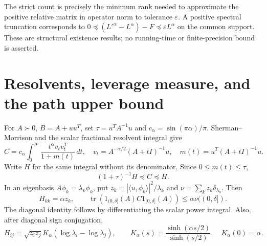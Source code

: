 \documentclass[11pt]{article}
\newcommand{\tr}{\operatorname{tr}}
\begin{document}
The strict count is precisely the minimum rank needed to approximate
the positive relative matrix in operator norm to tolerance
$\varepsilon$. A positive spectral truncation corresponds to
$0\preceq (L'^\alpha-L^\alpha)-F\preceq\varepsilon L^\alpha$
on the common support. These are structural existence results;
no running-time or finite-precision bound is asserted.

\section{Resolvents, leverage measure, and the path upper bound}
For $A\succ0$, $B=A+uu^T$, set $\tau=u^TA^{-1}u$ and
$c_\alpha=\sin(\pi\alpha)/\pi$. Sherman--Morrison and the scalar
fractional resolvent integral give
\begin{equation}\label{eq:res}
 C=c_\alpha\int_0^\infty
 \frac{t^\alpha v_tv_t^T}{1+m(t)}\,dt,\quad
 v_t=A^{-\alpha/2}(A+tI)^{-1}u,\quad
 m(t)=u^T(A+tI)^{-1}u.
\end{equation}
Write $H$ for the same integral without its denominator. Since
$0\le m(t)\le\tau$,
\begin{equation}\label{eq:sandwich}
 (1+\tau)^{-1}H\preceq C\preceq H.
\end{equation}
In an eigenbasis $A\phi_k=\lambda_k\phi_k$, put
$z_k=|\langle u,\phi_k\rangle|^2/\lambda_k$ and
$\nu=\sum_kz_k\delta_{\lambda_k}$. Then
\begin{equation}\label{eq:diag}
 H_{kk}=\alpha z_k,\qquad
 \tr(1_{(0,\delta]}(A)C1_{(0,\delta]}(A))
                                      \le\alpha\nu((0,\delta]).
\end{equation}
The diagonal identity follows by differentiating the scalar power
integral. Also, after diagonal sign conjugation,
\begin{equation}\label{eq:kernel}
 H_{ij}=\sqrt{z_iz_j}K_\alpha(\log\lambda_i-\log\lambda_j),\qquad
 K_\alpha(s)=\frac{\sinh(\alpha s/2)}{\sinh(s/2)},\quad K_\alpha(0)=\alpha.
\end{equation}
\end{document}
